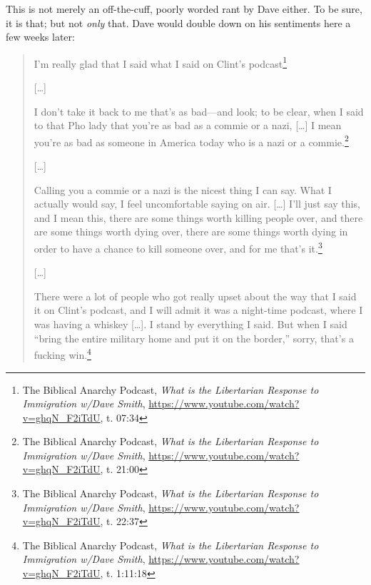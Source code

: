 \documentclass[11pt]{article}
\begin{document}
This is not merely an off-the-cuff, poorly worded rant by Dave either. To be sure, it is that; but not \emph{only} that. Dave would double down on his sentiments here a few weeks later:
\begin{quote}
I'm really glad that I said what I said on Clint's podcast\footnote{The Biblical Anarchy Podcast, \emph{What is the Libertarian Response to Immigration w/Dave Smith}, \url{https://www.youtube.com/watch?v=ghqN\_F2iTdU}, t. 07:34}

{[}\ldots{}]

I don't take it back to me that's as bad---and look; to be clear, when I said to that Pho lady that you're as bad as a commie or a nazi, [\ldots{}] I mean you're as bad as someone in America today who is a nazi or a commie.\footnote{The Biblical Anarchy Podcast, \emph{What is the Libertarian Response to Immigration w/Dave Smith}, \url{https://www.youtube.com/watch?v=ghqN\_F2iTdU}, t. 21:00}

{[}\ldots{}]

Calling you a commie or a nazi is the nicest thing I can say. What I actually would say, I feel uncomfortable saying on air. [\ldots{}] I'll just say this, and I mean this, there are some things worth killing people over, and there are some things worth dying over, there are some things worth dying in order to have a chance to kill someone over, and for me that's it.\footnote{The Biblical Anarchy Podcast, \emph{What is the Libertarian Response to Immigration w/Dave Smith}, \url{https://www.youtube.com/watch?v=ghqN\_F2iTdU}, t. 22:37}

{[}\ldots{}]

There were a lot of people who got really upset about the way that I said it on Clint's podcast, and I will admit it was a night-time podcast, where I was having a whiskey [\ldots{}]. I stand by everything I said. But when I said ``bring the entire military home and put it on the border,'' sorry, that's a fucking win.\footnote{The Biblical Anarchy Podcast, \emph{What is the Libertarian Response to Immigration w/Dave Smith}, \url{https://www.youtube.com/watch?v=ghqN\_F2iTdU}, t. 1:11:18}
\end{quote}
\end{document}
